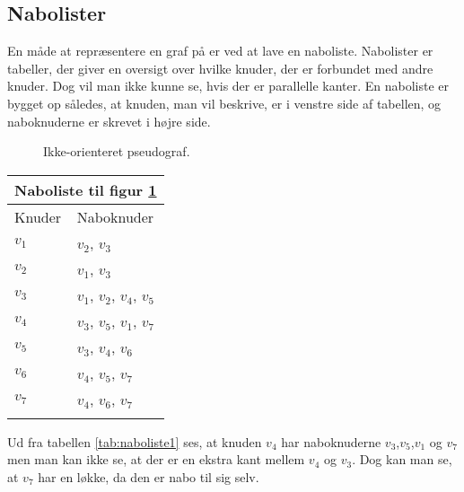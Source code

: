 \subsection{Nabolister}
En måde at repræsentere en graf på er ved at lave en naboliste. Nabolister er tabeller, der giver en oversigt over hvilke knuder, der er forbundet med andre knuder. Dog vil man ikke kunne se, hvis der er parallelle kanter. En naboliste er bygget op således, at knuden, man vil beskrive, er i venstre side af tabellen, og naboknuderne er skrevet i højre side. \\

\begin{figure}[h]
  \centering
  \caption{Ikke-orienteret pseudograf.}
  \label{fig:ikke-orienteret-pseudo}
\end{figure}

\begin{center}
	\begin{tabular}{ |p{4cm}||p{3cm}|}
	 	\hline
 		\multicolumn{2}{|c|}{Naboliste til figur \ref{fig:ikke-orienteret-pseudo}} \\
 		\hline
 		Knuder & Naboknuder\\
 		\hline
 		$v_1$ & $v_2$, $v_3$ \\
 		$v_2$ & $v_1$, $v_3$ \\
 		$v_3$ & $v_1$, $v_2$, $v_4$, $v_5$ \\
 		$v_4$ & $v_3$, $v_5$, $v_1$, $v_7$ \\
 		$v_5$ & $v_3$, $v_4$, $v_6$ \\
 		$v_6$ & $v_4$, $v_5$, $v_7$ \\
 		$v_7$ & $v_4$, $v_6$, $v_7$ \\
 	\hline
 	\label{tab:naboliste1} 	
	\end{tabular}
\end{center}
Ud fra tabellen \ref{tab:naboliste1} ses, at knuden $v_4$ har naboknuderne $v_3$,$v_5$,$v_1$ og $v_7$ men man kan ikke se, at der er en ekstra kant mellem $v_4$ og $v_3$. Dog kan man se, at $v_7$ har en løkke, da den er nabo til sig selv.

